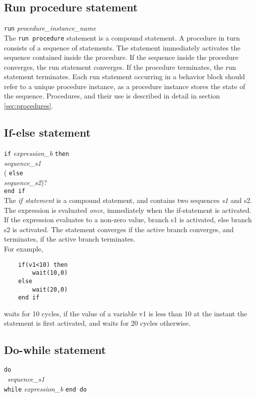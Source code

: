 	
	\subsection{Run procedure statement}
		\texttt{run} \textit{procedure\_instance\_name}\\

	The \texttt{run procedure} statement is a compound statement.
	A procedure in turn consists of a sequence of statements.
	The statement immediately activates the sequence contained inside
	the procedure. If the sequence inside the procedure converges,
	the run statement converges. If the procedure terminates, 
	the run statement terminates. Each run statement 
	occurring in a behavior block should refer to a unique procedure instance,
	as a procedure instance stores the state of the sequence.
	Procedures, and their use is described in detail in section \ref{sec:procedures}.


	\subsection{If-else statement}
	\texttt{if}  \textit{expression\_b} \texttt{then}\\
	\hspace{1 cm}\textit{sequence\_s1}\\
	( \texttt{else}\\
	\hspace{1 cm}\textit{sequence\_s2})? \\
	\texttt{end if}\\
	
	
	The \textit{if statement} is a compound statement, and contains two sequences \textit{s1} and {s2}.
	The expression is evaluated \emph{once}, immediately when the if-statement is activated. 
	If the expression evaluates to a non-zero value, branch s1 is activated, else branch s2 is activated.
	The statement converges if the active branch converges, and terminates, if the active branch terminates.\\

	For example,
	\begin{verbatim}
	if(v1<10) then
		wait(10,0)
	else
		wait(20,0)
	end if
	\end{verbatim}
	waits for 10 cycles, if the value of a variable 
	v1 is less than 10 at the instant the statement 
	is first activated, and waits for 20 cycles 
	otherwise.

	\subsection{Do-while statement}
		\texttt{do}\\
		\ \textit{sequence\_s1}\\
		\texttt{while} \textit{expression\_b} \texttt{end do}\\

